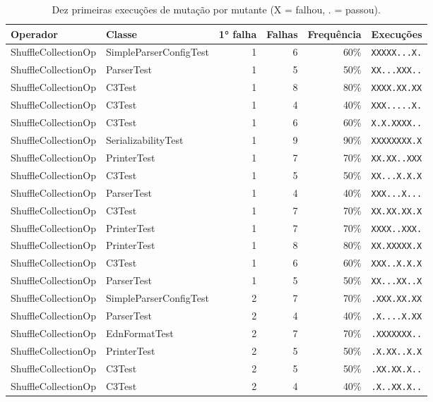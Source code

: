 \begin{table}[htbp]
\centering
\caption{Dez primeiras execuções de mutação por mutante (X = falhou, . = passou).}
\label{tab:10-first-execs-edn}
\begin{tabular}{llrrrl}
\toprule
Operador & Classe & 1° falha & Falhas & Frequência & Execuções \\
\midrule
ShuffleCollectionOp & SimpleParserConfigTest & 1 & 6 & 60\% & \texttt{XXXXX...X.} \\
ShuffleCollectionOp & ParserTest & 1 & 5 & 50\% & \texttt{XX...XXX..} \\
ShuffleCollectionOp & C3Test & 1 & 8 & 80\% & \texttt{XXXX.XX.XX} \\
ShuffleCollectionOp & C3Test & 1 & 4 & 40\% & \texttt{XXX.....X.} \\
ShuffleCollectionOp & C3Test & 1 & 6 & 60\% & \texttt{X.X.XXXX..} \\
ShuffleCollectionOp & SerializabilityTest & 1 & 9 & 90\% & \texttt{XXXXXXXX.X} \\
ShuffleCollectionOp & PrinterTest & 1 & 7 & 70\% & \texttt{XX.XX..XXX} \\
ShuffleCollectionOp & C3Test & 1 & 5 & 50\% & \texttt{XX...X.X.X} \\
ShuffleCollectionOp & ParserTest & 1 & 4 & 40\% & \texttt{XXX...X...} \\
ShuffleCollectionOp & C3Test & 1 & 7 & 70\% & \texttt{XX.XX.XX.X} \\
ShuffleCollectionOp & PrinterTest & 1 & 7 & 70\% & \texttt{XXXX..XXX.} \\
ShuffleCollectionOp & PrinterTest & 1 & 8 & 80\% & \texttt{XX.XXXXX.X} \\
ShuffleCollectionOp & C3Test & 1 & 6 & 60\% & \texttt{XXX..X.X.X} \\
ShuffleCollectionOp & ParserTest & 1 & 5 & 50\% & \texttt{XX...XX..X} \\
ShuffleCollectionOp & SimpleParserConfigTest & 2 & 7 & 70\% & \texttt{.XXX.XX.XX} \\
ShuffleCollectionOp & ParserTest & 2 & 4 & 40\% & \texttt{.X....X.XX} \\
ShuffleCollectionOp & EdnFormatTest & 2 & 7 & 70\% & \texttt{.XXXXXXX..} \\
ShuffleCollectionOp & PrinterTest & 2 & 5 & 50\% & \texttt{.X.XX..X.X} \\
ShuffleCollectionOp & C3Test & 2 & 5 & 50\% & \texttt{.XX.XX.X..} \\
ShuffleCollectionOp & C3Test & 2 & 4 & 40\% & \texttt{.X..XX.X..} \\

\end{tabular}
\end{table}
